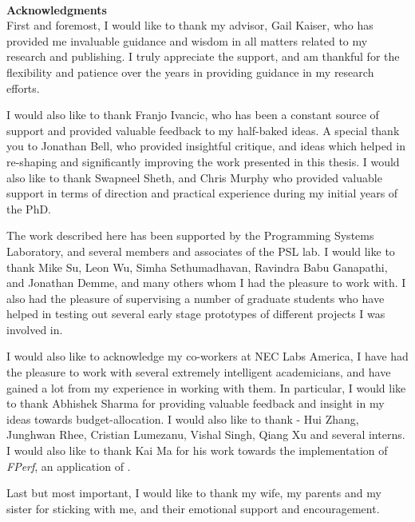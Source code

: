 ~\\[1in] %
\textbf{\Huge Acknowledgments}\\


First and foremost, I would like to thank my advisor, Gail Kaiser, who has provided me invaluable guidance and wisdom in all matters related to my research and publishing. I truly appreciate the support, and am thankful for the flexibility and patience over the years in providing guidance in my research efforts.


I would also like to thank Franjo Ivancic, who has been a constant source of support and provided valuable feedback to my half-baked ideas.
A special thank you to Jonathan Bell, who provided insightful critique, and ideas which helped in re-shaping and significantly improving the work presented in this thesis. I would also like to thank Swapneel Sheth, and Chris Murphy who provided valuable support in terms of direction and practical experience during my initial years of the PhD.


The work described here has been supported by the Programming Systems Laboratory, and several members and associates of the PSL lab. 
I would like to thank Mike Su, Leon Wu, Simha Sethumadhavan, Ravindra Babu Ganapathi, and Jonathan Demme, and many others whom I had the pleasure to work with. I also had the pleasure of supervising a number of graduate students who have helped in testing out several early stage prototypes of different projects I was involved in.


I would also like to acknowledge my co-workers at NEC Labs America, I have had the pleasure to work with several extremely intelligent academicians, and have gained a lot from my experience in working with them. In particular, I would like to thank Abhishek Sharma for providing valuable feedback and insight in my ideas towards budget-allocation. I would also like to thank - Hui Zhang, Junghwan Rhee, Cristian Lumezanu, Vishal Singh, Qiang Xu and several interns. I would also like to thank Kai Ma for his work towards the implementation of \emph{FPerf}, an application of \iprobe. 


Last but most important, I would like to thank my wife, my parents and my sister for sticking with me, and their emotional support and encouragement.
